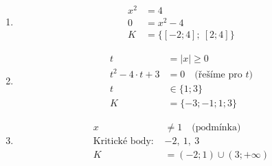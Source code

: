 \documentclass[11pt,a4paper]{article}
\begin{document}
\begin{zadaniReseniBox}[title={Domácí úkol}]
\begin{enumerate}[label=\alph*),itemsep=2pt]
\item
\[\begin{aligned}
x^{2}&=4\\[2pt]
0&=x^{2} - 4\\[2pt]
K&=\{[-2;4];\ [2;4]\}
\end{aligned}\]
\item
\[\begin{aligned}
t&=|x|\ge0\\[2pt]
t^{2} - 4 \cdot t + 3&=0\quad\text{(řešíme pro }t\text{)}\\[2pt]
t&\in \{1;3\}\\[2pt]
K&=\{-3;-1;1;3\}
\end{aligned}\]
\item
\[\begin{aligned}
x&\ne 1\quad\text{(podmínka)}\\[2pt]
\text{Kritické body: }&-2,\ 1,\ 3\\[2pt]
K&=(-2;1)\cup(3;+\infty)
\end{aligned}\]
\end{enumerate}
\end{zadaniReseniBox}
\end{document}
